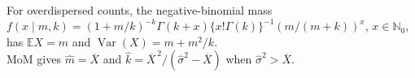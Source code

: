 \begin{example} \label{ex:negative-binomial-overdispersion-estimation} \\
For overdispersed counts, the negative-binomial mass\\
$f(x\mid m,k)=(1+m/k)^{-k}\Gamma(k+x)\{x!\Gamma(k)\}^{-1}(m/(m+k))^x$, $x\in\mathbb{N}_0$, has $\mathbb{E}X=m$ and $\operatorname{Var}(X)=m+m^2/k$.\\
MoM gives $\widehat{m}=\overline{X}$ and $\widehat{k}=\overline{X}^{\,2}/(\widehat{\sigma}^2-\overline{X})$ when $\widehat{\sigma}^2>\overline{X}$.
\end{example}
